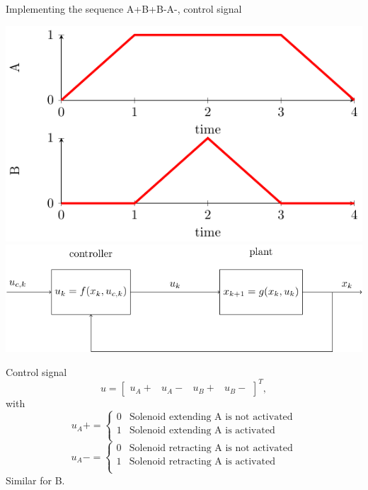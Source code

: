\documentclass[presentation,aspectratio=1610]{beamer}
\begin{document}
\begin{frame}[label={sec:orgcbc9d84}]{Implementing the sequence A+B+B-A-, control signal}
\begin{center}
\includegraphics[width=0.3\linewidth]{../figures/AplusBplusBminAmin}
\includegraphics[width=0.68\linewidth]{../figures/logic-control-loop}
\end{center}

\begin{block}{Control signal}
 \[ u = \begin{bmatrix} u_A+ & u_A- & u_B+ & u_B- \end{bmatrix}^T, \]
 with
 \[ u_A+ = \begin{cases} 0 & \text{Solenoid extending A is not activated}\\
                               1&\text{Solenoid extending A is activated}\\
              \end{cases}
   \]
 \[ u_A- = \begin{cases} 0 & \text{Solenoid retracting A is not activated}\\
                               1&\text{Solenoid retracting A is activated}\\
              \end{cases}
   \]
Similar for B.
\end{block}
\end{frame}
\end{document}
